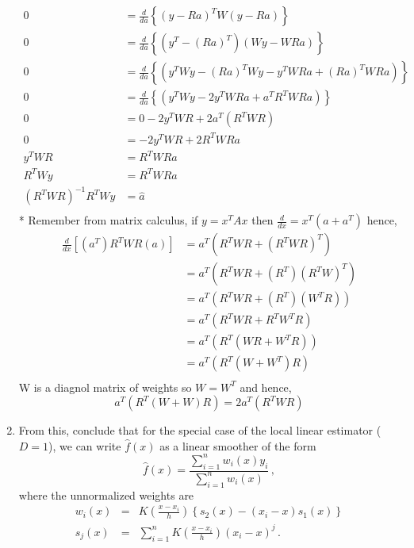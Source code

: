 \documentclass{homework}
\newcommand{\1}{\mathbf{1}}
\begin{document}
\begin{enumerate}[label=(\Alph*)]
\begin{equation} \begin{split}
0 &= \frac{d}{da}\left\{ ( y - Ra)^T W (y - Ra) \right\}  \\
0 &= \frac{d}{da}\left\{ ( y^T - (Ra)^T) (Wy - WRa) \right\} \\
0 &= \frac{d}{da}\left\{ ( y^TWy - (Ra)^TWy  - y^TWRa + (Ra)^TWRa ) \right\}  \\
0 &= \frac{d}{da}\left\{ ( y^TWy -2y^TWRa + a^TR^TWRa ) \right\}  \\
0 &= 0 -2y^TWR + 2a^T(R^TWR)   \\
0 &= - 2y^TWR + 2R^TWRa \\
y^TWR &= R^TWRa \\
R^TWy &= R^TWRa \\
(R^TWR)^{-1}R^TWy &=  \hat{a}\\
\end{split}\end{equation}
* Remember from matrix calculus, if $y = x^TAx$ then $\frac{d}{dx} = x^T(a + a^T)$ hence, 
\begin{equation} \begin{split}
\frac{d}{dx} [ (a^T)R^TWR(a) ] & = a^T(R^TWR + (R^TWR)^T) \\
&=a^T(R^TWR + (R^T)(R^TW)^T)\\
&=a^T(R^TWR + (R^T)(W^TR))\\
&=a^T(R^TWR + R^TW^TR)\\
&=a^T(R^T( WR + W^TR))\\
&=a^T(R^T( W + W^T)R)\\
\end{split}\end{equation}
W is a diagnol matrix of weights so $W = W^T$ and hence,
$$ a^T(R^T( W + W )R) = 2a^T(R^TWR)$$

\item From this, conclude that for the special case of the local linear estimator ($D=1$), we can write $\hat{f}(x)$ as a linear smoother of the form
$$
\hat{f}(x) = \frac{\sum_{i=1}^n w_i(x) y_i }{\sum_{i=1}^n w_i(x)} \, ,
$$
where the unnormalized weights are
\begin{eqnarray*}
w_i(x) &=& K \left( \frac{x-x_i}{h} \right) \left\{  s_2(x) - (x_i-x) s_1(x) \right\}\\
s_j(x) &=& \sum_{i=1}^n K \left( \frac{x-x_i}{h} \right) (x_i-x)^j \, .
\end{eqnarray*}


\end{enumerate}
\end{document}
